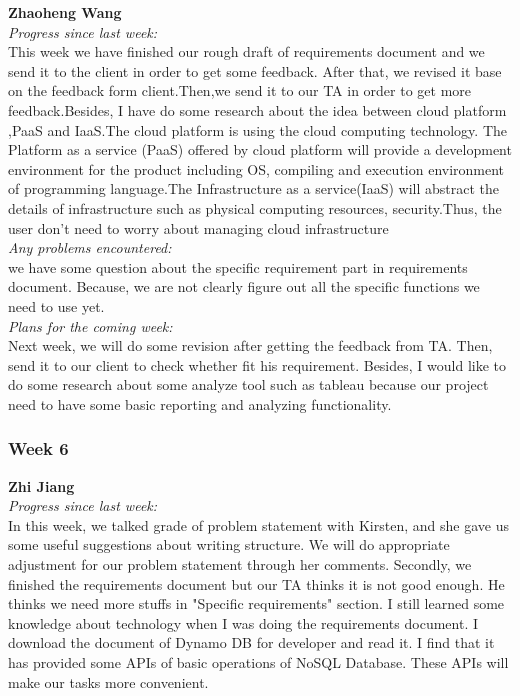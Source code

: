 \noindent\textbf{Zhaoheng Wang}\\
\noindent\textit{Progress since last week:}\\
This week we have finished our rough draft of requirements document and we send it to the client in order to get some feedback. After that, we revised it base on the feedback form client.Then,we send it to our TA in order to get more feedback.Besides, I have do some research about the idea between cloud platform ,PaaS and IaaS.The cloud platform is using the cloud computing technology. The Platform as a service (PaaS) offered by cloud platform will provide ​a development environment for the product including OS, compiling and execution environment of programming language.The Infrastructure as a service(​IaaS)​ will ​abstract the details of infrastructure​ such as ​physical computing resources​, security.Thus, the user don’t need to worry about managing ​cloud infrastructure\\    

\noindent\textit{Any problems encountered:}\\
we have some question about the specific requirement part in requirements document. Because, we are not clearly figure out all the specific functions we need to use yet.\\

\noindent\textit{Plans for the coming week:}\\
Next week, we will do some revision after getting the feedback from TA. Then, send it to our client to check whether fit his requirement. Besides, I would like to do some research about some analyze tool such as tableau because our project need to have some basic reporting and analyzing functionality.    

\subsubsection{Week 6}

\textbf{Zhi Jiang}\\
\noindent\textit{Progress since last week:}\\
In this week, we talked grade of problem statement with Kirsten, and she gave us some useful suggestions about writing structure. We will do appropriate adjustment for our problem statement through her comments. Secondly, we finished the requirements document but our TA thinks it is not good enough. He thinks we need more stuffs in "Specific requirements" section. I still learned some knowledge about technology when I was doing the requirements document. I download the document of Dynamo DB for developer and read it. I find that it has provided some APIs of basic operations of NoSQL Database. These APIs will make our tasks more convenient.\\


